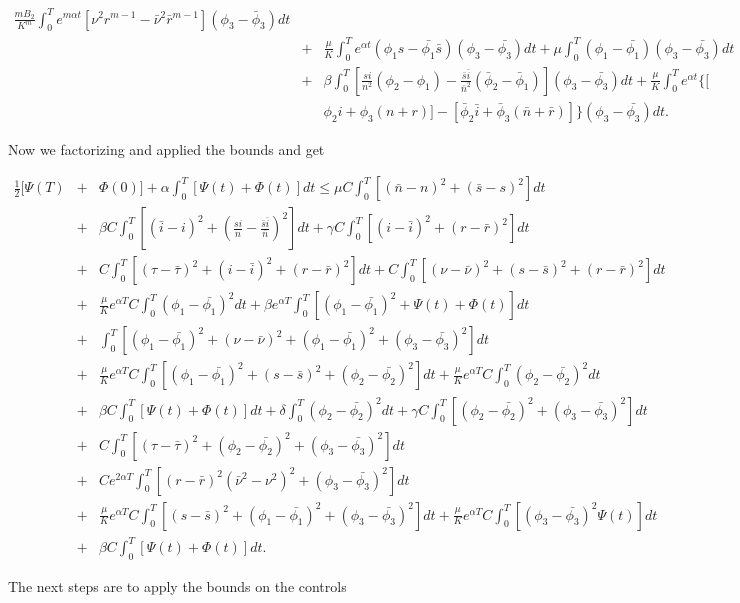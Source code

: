 \begin{eqnarray*}
\frac{m B_2}{K^m}\int_{0}^{T}e^{m\alpha t}[\nu^2r^{m-1}-\bar{\nu}^2\bar{r}^{m-1}](\phi_3-\bar{\phi}_3)dt\\
&+&\frac{\mu}{K}\int_{0}^{T}e^{\alpha t}(\phi_1 s-\bar{\phi_1}\bar{s})(\phi_3-\bar{\phi_3})dt +\mu\int_{0}^{T}(\phi_1-\bar{\phi_1})(\phi_3-\bar{\phi_3})dt\nonumber\\
&+&\beta\int_{0}^{T}\left[\frac{s i}{n^2}(\phi_2-\phi_1)-\frac{\bar{s} \bar{i}}{\bar{n}^2}(\bar{\phi}_2-\bar{\phi}_1)\right](\phi_3-\bar{\phi_3})dt+\frac{\mu}{K}\int_{0}^{T}e^{\alpha t}\{[ \nonumber\\
&&\phi_2 i+\phi_3(n+r)]-[\bar{\phi}_2 \bar{i}+\bar{\phi}_3(\bar{n}+\bar{r})]\}(\phi_3-\bar{\phi_3})dt. 
\end{eqnarray*}

Now we factorizing and applied the bounds and get

\begin{eqnarray*}
\frac{1}{2}[\Psi(T)&+&\Phi(0)]+\alpha\int_{0}^{T}[\Psi(t)+\Phi(t)]dt\leq \mu C\int_{0}^{T}[(\bar{n}-n)^2+(\bar{s}-s)^2]dt\\
&+&\beta C\int_{0}^{T}\left[(\bar{i}-i)^2+\left(\frac{si}{n}-\frac{\bar{s}\bar{i}}{\bar{n}}\right)^2\right]dt+\gamma C\int_{0}^{T}[(i-\bar{i})^2+(r-\bar{r})^2]dt\\
&+&C\int_{0}^{T}[(\tau-\bar{\tau})^2+(i-\bar{i})^2+(r-\bar{r})^2]dt+C\int_{0}^{T}[(\nu-\bar{\nu})^2+(s-\bar{s})^2+(r-\bar{r})^2]dt\\
&+&\frac{\mu}{K}e^{\alpha T}C\int_{0}^{T}(\phi_1-\bar{\phi_1})^2dt+\beta e^{\alpha T}\int_{0}^{T}[(\phi_1-\bar{\phi_1})^2+\Psi(t)+\Phi(t)]dt\\
&+&\int_{0}^{T}[(\phi_1-\bar{\phi_1})^2+(\nu-\bar{\nu})^2+(\phi_1-\bar{\phi_1})^2+(\phi_3-\bar{\phi_3})^2]dt\\
&+&\frac{\mu}{K}e^{\alpha T}C\int_{0}^{T}[(\phi_1-\bar{\phi_1})^2+(s-\bar{s})^2+(\phi_2-\bar{\phi_2})^2]dt+\frac{\mu}{K}e^{\alpha T}C\int_{0}^{T}(\phi_2-\bar{\phi_2})^2dt\\
&+& \beta C\int_{0}^{T}[\Psi(t)+\Phi(t)]dt+\delta\int_{0}^{T}(\phi_2-\bar{\phi_2})^2dt+\gamma C\int_{0}^{T}[(\phi_2-\bar{\phi_2})^2+(\phi_3-\bar{\phi_3})^2]dt\\
&+& C\int_{0}^{T}[(\tau-\bar{\tau})^2+(\phi_2-\bar{\phi_2})^2+(\phi_3-\bar{\phi_3})^2]dt\\
&+&Ce^{2\alpha T}\int_{0}^{T}[(r-\bar{r})^2(\bar{\nu}^2-\nu^2)^2+(\phi_3-\bar{\phi_3})^2]dt\\
&+&\frac{\mu}{K}e^{\alpha T}C\int_{0}^{T}[(s-\bar{s})^2+(\phi_1-\bar{\phi_1})^2+(\phi_3-\bar{\phi_3})^2]dt + \frac{\mu}{K}e^{\alpha T}C\int_{0}^{T}[(\phi_3-\bar{\phi_3})^2\Psi(t)]dt\\
&+&\beta C\int_{0}^{T}[\Psi (t)+\Phi(t)]dt.
\end{eqnarray*}

The next steps are to apply the bounds on the controls











